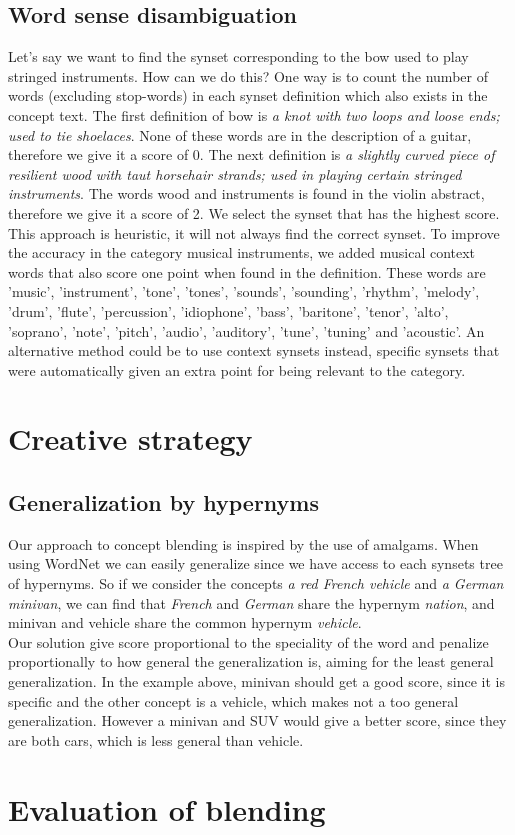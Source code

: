 
\subsection{Word sense disambiguation}
Let's say we want to find the synset corresponding to the bow used to play stringed instruments. How can we do this? One way is to count the number of words (excluding stop-words) in each synset definition which also exists in the concept text. The first definition of bow is \emph{a knot with two loops and loose ends; used to tie shoelaces}. None of these words are in the description of a guitar, therefore we give it a score of 0. The next definition is \emph{a slightly curved piece of resilient wood with taut horsehair strands; used in playing certain stringed instruments}. The words wood and instruments is found in the violin abstract, therefore we give it a score of 2. We select the synset that has the highest score. This approach is heuristic, it will not always find the correct synset.
To improve the accuracy in the category musical instruments, we added musical context words that also score one point when found in the definition. These words are 'music', 'instrument', 'tone', 'tones', 'sounds', 'sounding', 'rhythm', 'melody', 'drum', 'flute', 'percussion', 'idiophone',
'bass', 'baritone', 'tenor', 'alto', 'soprano', 'note', 'pitch', 'audio', 'auditory', 'tune', 'tuning' and 'acoustic'.
An alternative method could be to use context synsets instead, specific synsets that were automatically given an extra point for being relevant to the category.


\section{Creative strategy}
\subsection{Generalization by hypernyms}
Our approach to concept blending is inspired by the use of amalgams. When using WordNet we can easily generalize since we have access to each synsets tree of hypernyms. So if we consider the concepts \emph{a red French vehicle} and \emph{a German minivan}, we can find that \emph{French} and \emph{German} share the hypernym \emph{nation}, and minivan and vehicle share the common hypernym \emph{vehicle}.\\
Our solution give score proportional to the speciality of the word and penalize proportionally to how general the generalization is, aiming for the least general generalization. In the example above, minivan should get a good score, since it is specific and the other concept is a vehicle, which makes not a too general generalization. However a minivan and SUV would give a better score, since they are both cars, which is less general than vehicle.


\section{Evaluation of blending}

